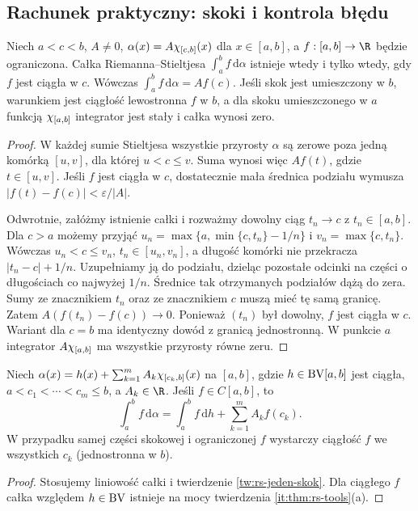 \subsection*{Rachunek praktyczny: skoki i kontrola błędu}
\begin{twierdzenie}\label{tw:rs-jeden-skok}
Niech $a<c<b$, $A\ne0$, $\alpha(x)=A\chi_{[c,b]}(x)$ dla $x\in[a,b]$, a $f:[a,b]\to\R$ będzie ograniczona. Całka Riemanna--Stieltjesa $\int_a^b f\,\mathrm d\alpha$ istnieje wtedy i tylko wtedy, gdy $f$ jest ciągła w $c$. Wówczas $\int_a^b f\,\mathrm d\alpha=Af(c)$. Jeśli skok jest umieszczony w $b$, warunkiem jest ciągłość lewostronna $f$ w $b$, a dla skoku umieszczonego w $a$ funkcją $\chi_{[a,b]}$ integrator jest stały i całka wynosi zero.
\end{twierdzenie}
\begin{proof}
W każdej sumie Stieltjesa wszystkie przyrosty $\alpha$ są zerowe poza jedną komórką $[u,v]$, dla której $u<c\le v$. Suma wynosi więc $Af(t)$, gdzie $t\in[u,v]$. Jeśli $f$ jest ciągła w $c$, dostatecznie mała średnica podziału wymusza $|f(t)-f(c)|<\varepsilon/|A|$.

Odwrotnie, załóżmy istnienie całki i rozważmy dowolny ciąg $t_n\to c$ z $t_n\in[a,b]$. Dla $c>a$ możemy przyjąć $u_n=\max\{a,\min\{c,t_n\}-1/n\}$ i $v_n=\max\{c,t_n\}$. Wówczas $u_n<c\le v_n$, $t_n\in[u_n,v_n]$, a długość komórki nie przekracza $|t_n-c|+1/n$. Uzupełniamy ją do podziału, dzieląc pozostałe odcinki na części o długościach co najwyżej $1/n$. Średnice tak otrzymanych podziałów dążą do zera. Sumy ze znacznikiem $t_n$ oraz ze znacznikiem $c$ muszą mieć tę samą granicę. Zatem $A(f(t_n)-f(c))\to0$. Ponieważ $(t_n)$ był dowolny, $f$ jest ciągła w $c$. Wariant dla $c=b$ ma identyczny dowód z granicą jednostronną. W punkcie $a$ integrator $A\chi_{[a,b]}$ ma wszystkie przyrosty równe zeru.
\end{proof}
\begin{wniosek}\label{wn:rs-suma-skokow}
Niech $\alpha(x)=h(x)+\sum_{k=1}^m A_k\chi_{[c_k,b]}(x)$ na $[a,b]$, gdzie $h\in\mathrm{BV}[a,b]$ jest ciągła, $a<c_1<\cdots<c_m\le b$, a $A_k\in\R$. Jeśli $f\in C[a,b]$, to
\[
\int_a^b f\,\mathrm d\alpha=\int_a^b f\,\mathrm dh+\sum_{k=1}^m A_kf(c_k).
\]
W przypadku samej części skokowej i ograniczonej $f$ wystarczy ciągłość $f$ we wszystkich $c_k$ (jednostronna w $b$).
\end{wniosek}
\begin{proof}
Stosujemy liniowość całki i twierdzenie \ref{tw:rs-jeden-skok}. Dla ciągłego $f$ całka względem $h\in\mathrm{BV}$ istnieje na mocy twierdzenia \ref{it:thm:rs-tools}(a).
\end{proof}
